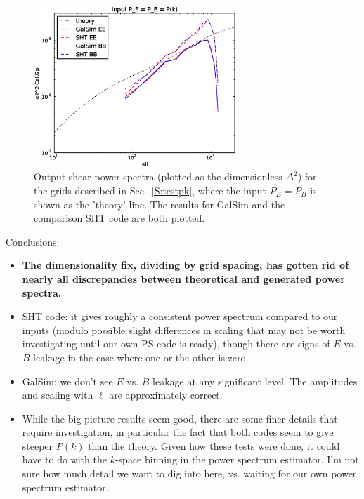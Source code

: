 \documentclass[preprint]{aastex}
\begin{document}
\begin{figure}
\begin{center}
\includegraphics[width=3in]{../external/test_gridshear/output/compare_input_peb.eps}
\caption{Output shear power spectra (plotted as the dimensionless
  $\Delta^2$) for the grids described in Sec.~\ref{S:testpk}, where
  the input $P_E=P_B$ is shown as the 'theory' line. The results for GalSim and the
  comparison SHT code are both plotted.\label{F:peb}}
\end{center}
\end{figure}

Conclusions:
\begin{itemize}
\item \textbf{The dimensionality fix, dividing by grid spacing, has
    gotten rid of nearly all discrepancies between theoretical and
    generated power spectra.}
\item SHT code: it gives roughly a consistent power spectrum compared
  to our inputs (modulo possible slight differences in scaling that
  may not be worth investigating until our own PS code is ready),
  though there are signs of $E$ vs. $B$ leakage in the case where one
  or the other is zero.
\item GalSim: we don't see $E$ vs. $B$ leakage at any significant
  level.  The amplitudes and scaling with $\ell$ are approximately
  correct.
\item While the big-picture results seem good, there are some finer
  details that require investigation, in particular the fact that both
  codes seem to give steeper $P(k)$ than the theory.  Given how these
  tests were done, it could have to do with the $k$-space binning in
  the power spectrum estimator.  I'm not sure how much detail we want
  to dig into here, vs. waiting for our own power spectrum estimator.
\end{itemize}
\end{document}
